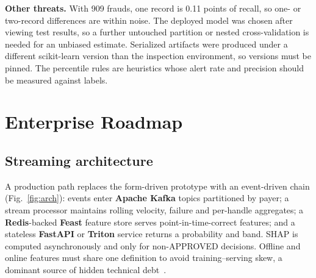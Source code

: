 \documentclass[conference]{IEEEtran}
\begin{document}
\textbf{Other threats.} With 909 frauds, one record is 0.11 points of recall, so one- or two-record differences are within noise. The deployed model was chosen after viewing test results, so a further untouched partition or nested cross-validation is needed for an unbiased estimate. Serialized artifacts were produced under a different scikit-learn version than the inspection environment, so versions must be pinned. The percentile rules are heuristics whose alert rate and precision should be measured against labels.

\section{Enterprise Roadmap}
\subsection{Streaming architecture}
A production path replaces the form-driven prototype with an event-driven chain (Fig.~\ref{fig:arch}): events enter \textbf{Apache Kafka} topics partitioned by payer; a stream processor maintains rolling velocity, failure and per-handle aggregates; a \textbf{Redis}-backed \textbf{Feast} feature store serves point-in-time-correct features; and a stateless \textbf{FastAPI} or \textbf{Triton} service returns a probability and band. SHAP is computed asynchronously and only for non-APPROVED decisions. Offline and online features must share one definition to avoid training--serving skew, a dominant source of hidden technical debt~\cite{sculley15}.
\end{document}
